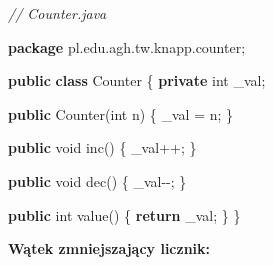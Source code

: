 \documentclass[11pt]{article}
\newenvironment{Shaded}{}{}
\newcommand{\KeywordTok}[1]{\textcolor[rgb]{0.00,0.44,0.13}{\textbf{{#1}}}}
\newcommand{\DataTypeTok}[1]{\textcolor[rgb]{0.56,0.13,0.00}{{#1}}}
\newcommand{\CommentTok}[1]{\textcolor[rgb]{0.38,0.63,0.69}{\textit{{#1}}}}
\newcommand{\FunctionTok}[1]{\textcolor[rgb]{0.02,0.16,0.49}{{#1}}}
\newcommand{\NormalTok}[1]{{#1}}
\newcommand{\ImportTok}[1]{{#1}}
\newcommand{\ControlFlowTok}[1]{\textcolor[rgb]{0.00,0.44,0.13}{\textbf{{#1}}}}
\newcommand{\OperatorTok}[1]{\textcolor[rgb]{0.40,0.40,0.40}{{#1}}}
\begin{document}
\begin{Shaded}
\begin{Highlighting}[]
\CommentTok{// Counter.java}

\KeywordTok{package}\ImportTok{ pl}\OperatorTok{.}\ImportTok{edu}\OperatorTok{.}\ImportTok{agh}\OperatorTok{.}\ImportTok{tw}\OperatorTok{.}\ImportTok{knapp}\OperatorTok{.}\ImportTok{counter}\OperatorTok{;}

\KeywordTok{public} \KeywordTok{class}\NormalTok{ Counter }\OperatorTok{\{}
    \KeywordTok{private} \DataTypeTok{int}\NormalTok{ \_val}\OperatorTok{;}

    \KeywordTok{public} \FunctionTok{Counter}\OperatorTok{(}\DataTypeTok{int}\NormalTok{ n}\OperatorTok{)} \OperatorTok{\{}
\NormalTok{        \_val }\OperatorTok{=}\NormalTok{ n}\OperatorTok{;}
    \OperatorTok{\}}

    \KeywordTok{public} \DataTypeTok{void} \FunctionTok{inc}\OperatorTok{()} \OperatorTok{\{}
\NormalTok{        \_val}\OperatorTok{++;}
    \OperatorTok{\}}

    \KeywordTok{public} \DataTypeTok{void} \FunctionTok{dec}\OperatorTok{()} \OperatorTok{\{}
\NormalTok{        \_val}\OperatorTok{{-}{-};}
    \OperatorTok{\}}

    \KeywordTok{public} \DataTypeTok{int} \FunctionTok{value}\OperatorTok{()} \OperatorTok{\{}
        \ControlFlowTok{return}\NormalTok{ \_val}\OperatorTok{;}
    \OperatorTok{\}}
\OperatorTok{\}}
\end{Highlighting}
\end{Shaded}

\textbf{Wątek zmniejszający licznik:}
\end{document}
